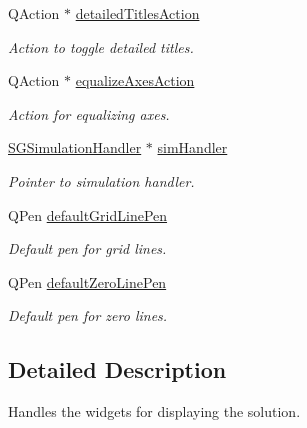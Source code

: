 \begin{DoxyCompactItemize}
Q\+Action $\ast$ \hyperlink{classSGSolutionHandler__V2_a479a3dc5678c75907ce5db05a85fedf7}{detailed\+Titles\+Action}
\begin{DoxyCompactList}\small\item\em Action to toggle detailed titles. \end{DoxyCompactList}\item 
\mbox{\label{classSGSolutionHandler__V2_ae39b89648f3254564953c0616b0a5d14}} 
Q\+Action $\ast$ \hyperlink{classSGSolutionHandler__V2_ae39b89648f3254564953c0616b0a5d14}{equalize\+Axes\+Action}
\begin{DoxyCompactList}\small\item\em Action for equalizing axes. \end{DoxyCompactList}\item 
\mbox{\label{classSGSolutionHandler__V2_ae799d69db58d5fe592bfde63e83f8401}} 
\hyperlink{classSGSimulationHandler}{S\+G\+Simulation\+Handler} $\ast$ \hyperlink{classSGSolutionHandler__V2_ae799d69db58d5fe592bfde63e83f8401}{sim\+Handler}
\begin{DoxyCompactList}\small\item\em Pointer to simulation handler. \end{DoxyCompactList}\item 
\mbox{\label{classSGSolutionHandler__V2_a3984a31e23d22543d5d7bfa33f2fba14}} 
Q\+Pen \hyperlink{classSGSolutionHandler__V2_a3984a31e23d22543d5d7bfa33f2fba14}{default\+Grid\+Line\+Pen}
\begin{DoxyCompactList}\small\item\em Default pen for grid lines. \end{DoxyCompactList}\item 
\mbox{\label{classSGSolutionHandler__V2_aff963a2a4f8bb98b2ca7399325faa76f}} 
Q\+Pen \hyperlink{classSGSolutionHandler__V2_aff963a2a4f8bb98b2ca7399325faa76f}{default\+Zero\+Line\+Pen}
\begin{DoxyCompactList}\small\item\em Default pen for zero lines. \end{DoxyCompactList}\end{DoxyCompactItemize}


\subsection{Detailed Description}
Handles the widgets for displaying the solution. 

